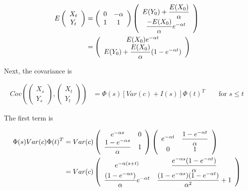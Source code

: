 \documentclass{article}
\numberwithin{questioncounter}{section}
\begin{document}
\begin{solution}
\begin{align*}
E\left(\begin{array}{c} X_{t} \\ Y_{t} \end{array} \right) &= \left(\begin{array}{c c} 0 & -\alpha \\ 1 & 1 \end{array} \right)  \left(\begin{array}{c} E(Y_{0}) + \dfrac{E(X_{0})}{\alpha} \\ \dfrac{- E(X_{0})}{\alpha}  e^{-\alpha t} \end{array} \right) \\
&= \left(\begin{array}{c} E(X_{0}) e^{-\alpha t} \\ E(Y_{0}) + \dfrac{E(X_{0})}{\alpha} (1 - e^{-\alpha t}) \end{array} \right)
\end{align*}

Next, the covariance is

\begin{align*}
Cov\left(\left(\begin{array}{c} X_{s} \\ Y_{s} \end{array} \right), \left(\begin{array}{c} X_{t} \\ Y_{t} \end{array} \right) \right) &= \Phi(s) \left[ Var(c) + I(s) \right] \Phi(t)^{T} \qquad \text{for $s \leq t$}
\end{align*}

The first term is

\begin{align*}
\Phi(s) Var(c) \Phi(t)^{T} &= Var(c) \left(\begin{array}{c c} e^{-\alpha s} & 0 \\ \dfrac{1 - e^{-\alpha s}}{\alpha} & 1 \end{array} \right) \left(\begin{array}{c c} e^{-\alpha t} & \dfrac{1 - e^{-\alpha t}}{\alpha} \\ 0 & 1 \end{array} \right) \\
&= Var(c) \left(\begin{array}{c c} e^{-\alpha(s+t)} & \dfrac{e^{-\alpha  s}(1 - e^{-\alpha t})}{\alpha} \\ \dfrac{(1 - e^{-\alpha s})}{\alpha} e^{-\alpha t} & \dfrac{(1 - e^{-\alpha s})(1 - e^{-\alpha t})}{\alpha^2} + 1 \end{array} \right)
\end{align*}


\end{solution}
\end{document}
